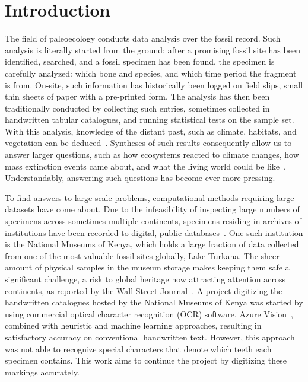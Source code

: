\documentclass[english,twoside,openright]{UH_DS_MSc}
\begin{document}
\mytableofcontents

\mynomenclature


\chapter{Introduction}

The field of paleoecology conducts data analysis over the fossil record.
Such analysis is literally started from the ground: after a promising fossil site has been identified, searched, and a fossil specimen has been found, the specimen is 
carefully analyzed: which bone and species, and which time period the fragment is from. On-site, such information has historically been logged on field slips, small thin sheets of 
paper with a pre-printed form. The analysis has then been traditionally conducted by 
collecting such entries, sometimes collected in handwritten tabular catalogues, and running statistical 
tests on the sample set. With this analysis, knowledge of the distant past, such as climate, habitats, and 
vegetation can be deduced~\cite{Faith_Lyman_2019}. Syntheses of such results consequently allow us to 
answer larger questions, such as how ecosystems reacted to climate changes, how mass extinction events 
came about, and what the living world could be like~\cite{Zliobaite2023}. Understandably, answering such 
questions has become ever more pressing.

To find answers to large-scale problems, computational methods requiring large datasets have come about. Due to the infeasibility of inspecting large numbers of specimens across sometimes multiple 
continents, specimens residing in archives of institutions have been recorded to digital, public databases~\cite{uhenCardCatalogsComputers2013}.
One such institution is the National Museums of Kenya, which holds a large fraction of data collected from one 
of the most valuable fossil sites globally, Lake Turkana. The sheer amount of physical samples in the museum storage
makes keeping them safe a significant challenge, a risk to global heritage now attracting attention across continents,
 as reported by the Wall Street Journal~\cite{hotzMuseumOverflowingPrehistoric2024}.
 A project digitizing the handwritten catalogues hosted by the National Museums of Kenya was started by
using commercial optical character recognition (OCR) software, Azure Vision~\cite{azurevision}, combined with heuristic and machine learning approaches, 
resulting in satisfactory accuracy on conventional handwritten text. However, this 
approach was not able to recognize special characters that denote which teeth each specimen contains. This work aims 
to continue the project by digitizing these markings accurately.
\end{document}
